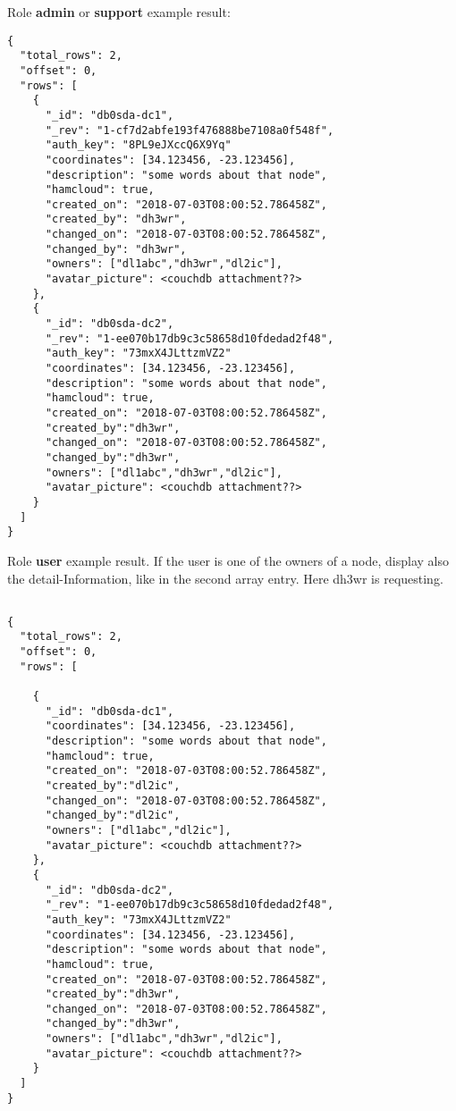 Role \textbf{admin} or \textbf{support} example result:
\begin{lstlisting}
{
  "total_rows": 2,
  "offset": 0,
  "rows": [
    {
      "_id": "db0sda-dc1",
      "_rev": "1-cf7d2abfe193f476888be7108a0f548f",
      "auth_key": "8PL9eJXccQ6X9Yq"
      "coordinates": [34.123456, -23.123456],
      "description": "some words about that node",
      "hamcloud": true,
      "created_on": "2018-07-03T08:00:52.786458Z",
      "created_by": "dh3wr",
      "changed_on": "2018-07-03T08:00:52.786458Z",
      "changed_by": "dh3wr",
      "owners": ["dl1abc","dh3wr","dl2ic"],
      "avatar_picture": <couchdb attachment??>
    },
    {
      "_id": "db0sda-dc2",
      "_rev": "1-ee070b17db9c3c58658d10fdedad2f48",
      "auth_key": "73mxX4JLttzmVZ2"
      "coordinates": [34.123456, -23.123456],
      "description": "some words about that node",
      "hamcloud": true,
      "created_on": "2018-07-03T08:00:52.786458Z",
      "created_by":"dh3wr",
      "changed_on": "2018-07-03T08:00:52.786458Z",
      "changed_by":"dh3wr",
      "owners": ["dl1abc","dh3wr","dl2ic"],
      "avatar_picture": <couchdb attachment??>
    }
  ]
}
\end{lstlisting}

Role \textbf{user} example result. If the user is one of the owners of a node, display also the detail-Information, like in the second array entry. Here dh3wr is requesting.
\begin{lstlisting}

{
  "total_rows": 2,
  "offset": 0,
  "rows": [

    {
      "_id": "db0sda-dc1",
      "coordinates": [34.123456, -23.123456],
      "description": "some words about that node",
      "hamcloud": true,
      "created_on": "2018-07-03T08:00:52.786458Z",
      "created_by":"dl2ic",
      "changed_on": "2018-07-03T08:00:52.786458Z",
      "changed_by":"dl2ic",
      "owners": ["dl1abc","dl2ic"],
      "avatar_picture": <couchdb attachment??>
    },
    {
      "_id": "db0sda-dc2",
      "_rev": "1-ee070b17db9c3c58658d10fdedad2f48",
      "auth_key": "73mxX4JLttzmVZ2"
      "coordinates": [34.123456, -23.123456],
      "description": "some words about that node",
      "hamcloud": true,
      "created_on": "2018-07-03T08:00:52.786458Z",
      "created_by":"dh3wr",
      "changed_on": "2018-07-03T08:00:52.786458Z",
      "changed_by":"dh3wr",
      "owners": ["dl1abc","dh3wr","dl2ic"],
      "avatar_picture": <couchdb attachment??>
    }
  ]
}
\end{lstlisting}

